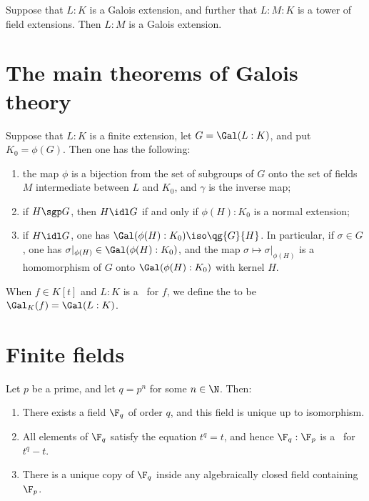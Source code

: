 \documentclass{article}
\begin{document}
  \begin{proposition}
    Suppose that $L:K$ is a Galois extension, and further that $L:M:K$ is a tower of field extensions. Then $L:M$ is a Galois extension.
  \end{proposition}

\section{The main theorems of Galois theory}
  \begin{theorem}
    Suppose that $L:K$ is a finite extension, let $G=\Gal(L:K)$, and put $K_0=\phi(G)$. Then one has the following:
    \begin{enumerate}[label=(\alph*)]
      \item the map $\phi$ is a bijection from the set of subgroups of $G$ onto the set of fields $M$ intermediate between $L$ and $K_0$, and $\gamma$ is the inverse map;
      \item if $H\sgp G$, then $H\idl G$ if and only if $\phi(H):K_0$ is a normal extension;
      \item if $H\idl G$, one has $\Gal(\phi(H):K_0)\iso \qg{G}{H}$. In particular, if $\sigma\in G$, one has $\sigma|_{\phi(H)}\in \Gal(\phi(H):K_0)$, and the map $\sigma\mapsto\sigma|_{\phi(H)}$ is a homomorphism of $G$ onto $\Gal(\phi(H):K_0)$ with kernel $H$.
    \end{enumerate}
  \end{theorem}

  \begin{definition}
    When $f\in K[t]$ and $L:K$ is a \sfe~for $f$, we define the  to be $ \Gal_K(f) = \Gal(L:K)$.
  \end{definition}

\section{Finite fields}
  \begin{theorem}
    Let $p$ be a prime, and let $q=p^n$ for some $n\in \N$. Then:
    \begin{enumerate}[label=(\alph*)]
      \item There exists a field $\F_q$ of order $q$, and this field is unique up to isomorphism.
      \item All elements of $\F_q$ satisfy the equation $t^q=t$, and hence $\F_q:\F_p$ is a \sfe~for $t^q-t$.
      \item There is a unique copy of $\F_q$ inside any algebraically closed field containing $\F_p$.
    \end{enumerate}
  \end{theorem}
\end{document}
